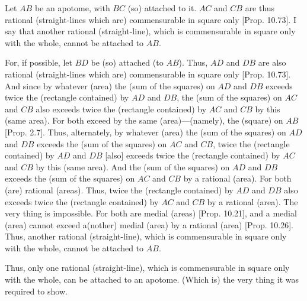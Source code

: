 \begin{Parallel}{}{}
{Let $AB$ be an apotome, with $BC$  (so) attached to it. $AC$ and $CB$ are thus
rational (straight-lines which are) commensurable in square only [Prop. 10.73]. I say that another rational (straight-line), which is commensurable in  square only with the whole, cannot
be attached to $AB$. 

For, if possible, let $BD$ be (so) attached (to $AB$). Thus, $AD$ and $DB$ are also
rational (straight-lines which are) commensurable in square only [Prop. 10.73]. And since by whatever (area)
the (sum of the squares) on $AD$ and $DB$ exceeds twice the
(rectangle contained) by $AD$ and $DB$, the (sum of the squares)
on $AC$ and $CB$ also exceeds twice the (rectangle contained) by $AC$ and
$CB$ by this (same area). For both exceed by the same (area)---(namely), the (square)
on $AB$ [Prop. 2.7]. Thus, alternately, 
by whatever (area) the (sum of the squares) on $AD$ and 
$DB$ exceeds the (sum of the squares) on $AC$ and $CB$, 
 twice the (rectangle contained) by $AD$ and $DB$
[also] exceeds twice the (rectangle contained) by $AC$ and $CB$ by this (same area).
And the (sum of the squares) on $AD$ and $DB$ exceeds the (sum
of the squares) on $AC$ and $CB$ by a rational (area). For both
(are) rational (areas). Thus, twice the (rectangle contained) by $AD$ and $DB$ also
exceeds twice the (rectangle contained) by $AC$ and $CB$ by a
rational (area). The very thing is impossible. For both are
medial (areas) [Prop. 10.21],
and a medial (area) cannot exceed a(nother) medial (area) by a rational
(area) [Prop. 10.26].  
Thus, another rational (straight-line), which is commensurable in  square only with the whole, cannot
be attached to $AB$.

Thus, only one rational (straight-line), which is
commensurable in square only with the whole, can be attached to an apotome.
(Which is) the very thing it was required to show.}
\end{Parallel}


\vspace{7pt}{\footnotesize\noindent$^\dag$ This proposition is equivalent to 
Prop.~10.42, with minus signs instead of
plus signs.}

